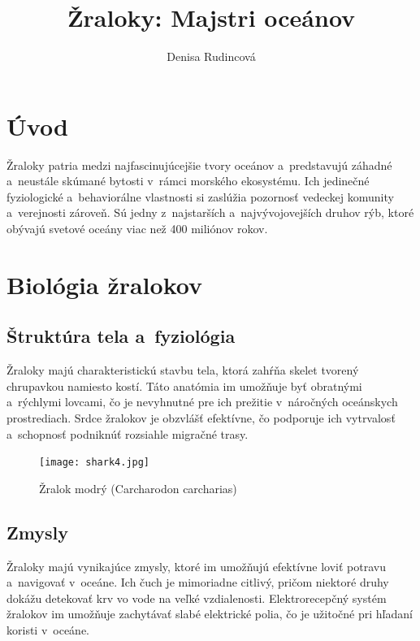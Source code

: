 \documentclass{artikel1}
\title{Žraloky: Majstri oceánov}
\author{Denisa Rudincová}
\begin{document}


\maketitle
\tableofcontents

\section{Úvod}
Žraloky patria medzi najfascinujúcejšie tvory oceánov a~predstavujú záhadné a~neustále skúmané bytosti v~rámci morského ekosystému. Ich jedinečné fyziologické a~behaviorálne vlastnosti si zaslúžia pozornosť vedeckej komunity a~verejnosti zároveň. Sú jedny z~najstarších a~najvývojovejších druhov rýb, ktoré obývajú svetové oceány viac než 400 miliónov rokov.

\section{Biológia žralokov}

\subsection{Štruktúra tela a~fyziológia}
Žraloky majú charakteristickú stavbu tela, ktorá zahŕňa skelet tvorený chrupavkou namiesto kostí. Táto anatómia im umožňuje byť obratnými a~rýchlymi lovcami, čo je nevyhnutné pre ich prežitie v~náročných oceánskych prostrediach. Srdce žralokov je obzvlášť efektívne, čo podporuje ich vytrvalosť a~schopnosť podniknúť rozsiahle migračné trasy.

\begin{figure}
  \begin{center}
  \texttt{[image: shark4.jpg]}
  \caption{Žralok modrý (Carcharodon carcharias)}
  \label{shark4}
  \end{center}
\end{figure}

\subsection{Zmysly}
Žraloky majú vynikajúce zmysly, ktoré im umožňujú efektívne loviť potravu a~navigovať v~oceáne. Ich čuch je mimoriadne citlivý, pričom niektoré druhy dokážu detekovať krv vo vode na veľké vzdialenosti. Elektrorecepčný systém žralokov im umožňuje zachytávať slabé elektrické polia, čo je užitočné pri hľadaní koristi v~oceáne. \cite{senses}
\end{document}
